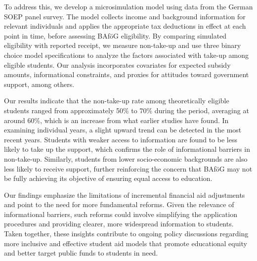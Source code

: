 
To address this, we develop a microsimulation model using data from the German SOEP panel survey. 
The model collects income and background information for relevant individuals and applies the appropriate tax deductions in effect at each point in time, before assessing BAföG eligibility. 
By comparing simulated eligibility with reported receipt, we measure non-take-up and use three binary choice model specifications to analyze the factors associated with take-up among eligible students. 
Our analysis incorporates covariates for expected subsidy amounts, informational constraints, and proxies for attitudes toward government support, among others. 

Our results indicate that the non-take-up rate among theoretically eligible students ranged from approximately 50\% to 70\% during the period, averaging at around 60\%, which is an increase from what earlier studies have found. 
In examining individual years, a slight upward trend can be detected in the most recent years. 
Students with weaker access to information are found to be less likely to take up the support, which confirms the role of informational barriers in non-take-up. Similarly, students from lower socio-economic backgrounds are also less likely to receive support, further reinforcing the concern that BAföG may not be fully achieving its objective of ensuring equal access to education.


Our findings emphasize the limitations of incremental financial aid adjustments and point to the need for more fundamental reforms. 
Given the relevance of informational barriers, such reforms could involve simplifying the application procedures and providing clearer, more widespread information to students. 
Taken together, these insights contribute to ongoing policy discussions regarding more inclusive and effective student aid models that promote educational equity and better target public funds to students in need.

